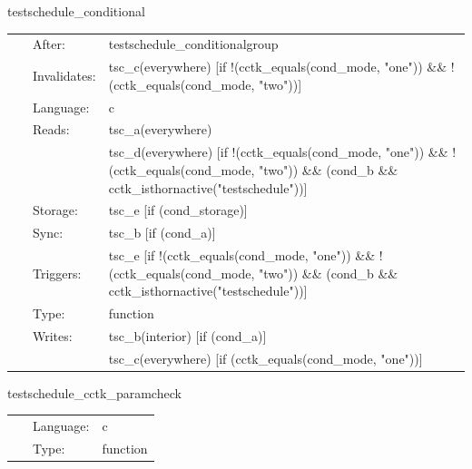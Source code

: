 \hspace{5mm} testschedule\_conditional 

\hspace{5mm}{\it test conditional clauses in schedule blocks } 


\hspace{5mm}

 \begin{tabular*}{160mm}{cll} 
~ & After:  & testschedule\_conditionalgroup \\ 
~ & Invalidates:  & tsc\_c(everywhere) [if !(cctk\_equals(cond\_mode, "one")) \&\& !(cctk\_equals(cond\_mode, "two"))] \\ 
~ & Language:  & c \\ 
~ & Reads:  & tsc\_a(everywhere) \\ 
~& ~ &tsc\_d(everywhere) [if !(cctk\_equals(cond\_mode, "one")) \&\& !(cctk\_equals(cond\_mode, "two")) \&\& (cond\_b \&\& cctk\_isthornactive("testschedule"))]\\ 
~ & Storage:  & tsc\_e [if (cond\_storage)] \\ 
~ & Sync:  & tsc\_b [if (cond\_a)] \\ 
~ & Triggers:  & tsc\_e [if !(cctk\_equals(cond\_mode, "one")) \&\& !(cctk\_equals(cond\_mode, "two")) \&\& (cond\_b \&\& cctk\_isthornactive("testschedule"))] \\ 
~ & Type:  & function \\ 
~ & Writes:  & tsc\_b(interior) [if (cond\_a)] \\ 
~& ~ &tsc\_c(everywhere) [if (cctk\_equals(cond\_mode, "one"))]\\ 
\end{tabular*} 


\vspace{5mm}


\hspace{5mm} testschedule\_cctk\_paramcheck 

\hspace{5mm}{\it test to see if function is placed in schedule and run at cctk\_paramcheck } 


\hspace{5mm}

 \begin{tabular*}{160mm}{cll} 
~ & Language:  & c \\ 
~ & Type:  & function \\ 
\end{tabular*} 


